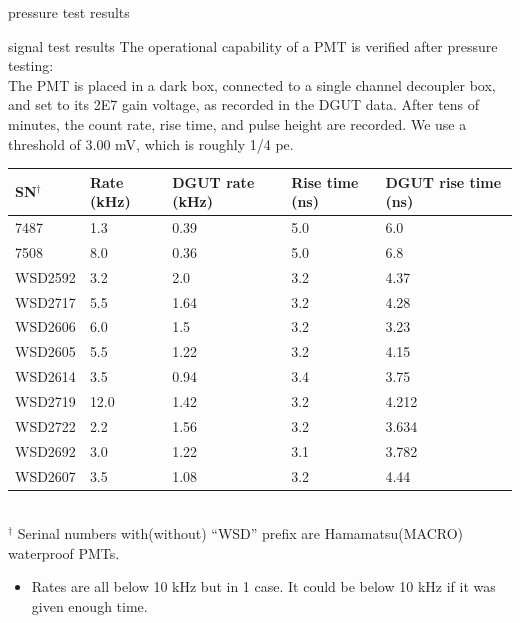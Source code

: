 \documentclass{beamer}
\begin{document}
\begin{frame}{pressure test results}
\end{frame}

\begin{frame}{signal test results}
	\small The operational capability of a PMT is verified after pressure testing:\\
	{\scriptsize The PMT is placed in a dark box, connected to a single channel decoupler box,
	and set to its 2E7 gain voltage, as recorded in the DGUT data. After tens of minutes,
	the count rate, rise time, and pulse height are recorded. We use a threshold of 3.00 
	mV, which is roughly 1/4 pe.
	}

	\setlength{\tabcolsep}{2pt}
	\small
	\begin{center}
	\begin{tabular}{|l|p{1.2cm}|p{1.9cm}|p{1.5cm}|p{1.7cm}|}
		\hline
		\textbf{SN}$^\dagger$&\textbf{Rate (kHz)}&\textbf{DGUT rate (kHz)}&\textbf{Rise time (ns)}&
		\textbf{DGUT rise time (ns)}\\
		\hline
		\hline
		7487   &1.3&0.39&5.0&6.0\\
		7508   &8.0&0.36&5.0&6.8\\
		WSD2592&3.2&2.0&3.2&4.37\\
		WSD2717&5.5&1.64&3.2&4.28\\
		WSD2606&6.0&1.5&3.2&3.23\\
		WSD2605&5.5&1.22&3.2&4.15\\
		WSD2614&3.5&0.94&3.4&3.75\\
		WSD2719&12.0&1.42&3.2&4.212\\
		WSD2722&2.2&1.56&3.2&3.634\\
		WSD2692&3.0&1.22&3.1&3.782\\
		WSD2607&3.5&1.08&3.2&4.44\\
		\hline
	\end{tabular}
	\tiny
	\\$^\dagger$ Serinal numbers with(without) ``WSD'' prefix are Hamamatsu(MACRO) waterproof PMTs. \\
		\begin{itemize}
			\tiny
			\item Rates are all below 10 kHz but in 1 case. It could be below 10 kHz if it
			was given enough time.
		\end{itemize}
	\end{center}
\end{frame}
\end{document}
